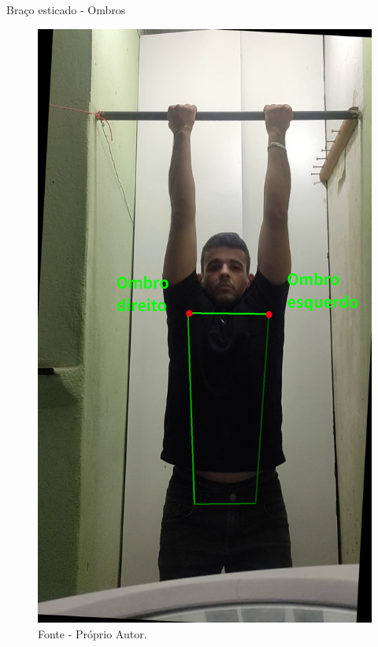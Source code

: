 \begin{frame}{Braço esticado - Ombros}
    \begin{figure}[!ht]
        \centering
            \includegraphics[scale=0.1]{img/desenvolvimento/bracoEsticado/tronco.png}
        \caption*{Fonte - Próprio Autor.}
    \end{figure}
\end{frame}




